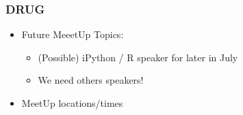 \documentclass{beamer}\usepackage[]{graphicx}\usepackage[]{color}
\begin{document}
\begin{frame}[fragile]
  \frametitle{DRUG}
  \begin{itemize}
    \item Future MeeetUp Topics:
      \begin{itemize}
        \item (Possible) iPython / R speaker for later in July
        \item We need others speakers!
      \end{itemize}
    \item MeetUp locations/times
  \end{itemize}
\end{frame} 
\end{document}
